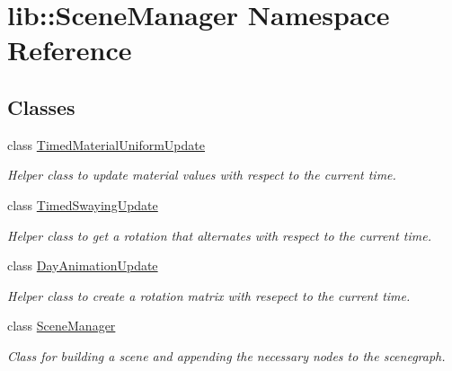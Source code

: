 \hypertarget{namespacelib_1_1SceneManager}{\section{lib\-:\-:\-Scene\-Manager \-Namespace \-Reference}
\label{namespacelib_1_1SceneManager}
}
\subsection*{\-Classes}
\begin{DoxyCompactItemize}
\item 
class \hyperlink{classlib_1_1SceneManager_1_1TimedMaterialUniformUpdate}{\-Timed\-Material\-Uniform\-Update}
\begin{DoxyCompactList}\small\item\em \-Helper class to update material values with respect to the current time. \end{DoxyCompactList}\item 
class \hyperlink{classlib_1_1SceneManager_1_1TimedSwayingUpdate}{\-Timed\-Swaying\-Update}
\begin{DoxyCompactList}\small\item\em \-Helper class to get a rotation that alternates with respect to the current time. \end{DoxyCompactList}\item 
class \hyperlink{classlib_1_1SceneManager_1_1DayAnimationUpdate}{\-Day\-Animation\-Update}
\begin{DoxyCompactList}\small\item\em \-Helper class to create a rotation matrix with resepect to the current time. \end{DoxyCompactList}\item 
class \hyperlink{classlib_1_1SceneManager_1_1SceneManager}{\-Scene\-Manager}
\begin{DoxyCompactList}\small\item\em \-Class for building a scene and appending the necessary nodes to the scenegraph. \end{DoxyCompactList}\end{DoxyCompactItemize}
